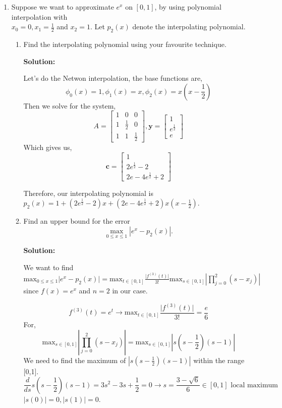 \documentclass[11pt]{article}
\newenvironment{solution}
  {\par\noindent\textbf{Solution:}\par}
  {\par}
\begin{document}
\begin{enumerate}
\begin{enumerate}
  \end{enumerate}

\item Suppose we want to approximate $e^x$ on $[0,1]$, by using polynomial
interpolation with \\ $x_0=0, x_1=\frac12$ and $x_2=1$. Let $p_2(x)$ denote
the interpolating polynomial.
\begin{enumerate}
\item Find the interpolating polynomial using your favourite technique.
  \begin{solution}
    Let's do the Netwon interpolation, the base functions are,
    $$\phi_0(x) = 1, \phi_1(x) = x, \phi_2(x) = x(x-\frac{1}{2})$$
    Then we solve for the system,
    $$A = 
      \begin{bmatrix}
        1 & 0 & 0 \\ 
        1 & \frac{1}{2} & 0 \\ 
        1 & 1 & \frac{1}{2}
      \end{bmatrix}, \textbf{y} = \begin{bmatrix}
        1 \\ 
        e^{\frac{1}{2}} \\  
        e
      \end{bmatrix}$$
  Which gives us,
  $$\textbf{c} = \begin{bmatrix} 1 \\ 2e^{\frac{1}{2}} - 2 \\ 2e-4e^{\frac{1}{2}} + 2\end{bmatrix}$$

  Therefore, our interpolating polynomial is $p_2(x) = 1 + (2e^{\frac{1}{2}}-2)x + (2e-4e^{\frac{1}{2}} + 2)x(x-\frac{1}{2})$.
  \end{solution}
\item Find an upper bound for  the error
$$ \max_{0 \le x \le 1} | e^x - p_2(x)|.$$

\begin{solution}
  We want to find 
  $\text{max}_{0 \le x \le 1} \vert e^x - p_2(x) \vert = \text{max}_{t \in [0,1]} \frac{\vert f^{(3)}(t)\vert}{3!}\text{max}_{s \in [0,1]}\left| \prod_{j=0}^2 (s-x_j) \right|$ since $f(x)=e^x$ and $n=2$ in our case.

  $$f^{(3)}(t) = e^t \to  \text{max}_{t \in [0,1]} \frac{\vert f^{(3)}(t)\vert}{3!} = \frac{e}{6}$$
  For,
  $$ \text{max}_{s \in [0,1]}\left| \prod_{j=0}^2 (s-x_j) \right| = \text{max}_{s \in [0,1]} \left| s(s-\frac{1}{2})(s-1) \right| $$
  We need to find the maximum of $\left| s(s-\frac{1}{2})(s-1) \right| $ within the range [0,1]. 
  $$\frac{d}{ds}s(s-\frac{1}{2})(s-1) = 3s^2-3s+\frac{1}{2} = 0 \to s = \frac{3-\sqrt{6}}{6} \in [0,1] \text{ local maximum}$$
  $\left| s(0) \right| = 0, \left| s(1) \right| = 0$.


\end{solution}
\end{enumerate}
\end{enumerate}
\end{document}

